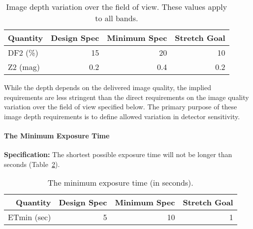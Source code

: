 \begin{table}[h]
\begin{tabular}{|l|r|r|r|}
\hline
Quantity   & Design Spec & Minimum Spec & Stretch Goal       \\
\hline
      DF2 (\%) &    15       &      20     &      10         \\
      Z2 (mag) &    0.2      &      0.4    &     0.2         \\
\hline
\end{tabular}
\caption{Image depth variation over the field of view. These values
apply to all bands.}
\label{depthVarFOV}
\end{table}

While the depth depends on the delivered image quality, the implied
requirements are less stringent than the direct requirements on the image
quality variation over the field of view specified below.  The primary
purpose of these image depth requirements is to define allowed variation in
detector sensitivity.


\newpage
\paragraph{The Minimum Exposure Time\\}

{\bf Specification:} The shortest possible exposure time will not be
longer than
seconds (Table~\ref{minTexp}).


\begin{table}[h]
\begin{tabular}{|r|r|r|r|}
\hline
Quantity   & Design Spec & Minimum Spec & Stretch Goal           \\
\hline
      ETmin (sec)  &      5       &      10      &       1       \\
\hline
\end{tabular}
\caption{The minimum exposure time (in seconds). }
\label{minTexp}
\end{table}



